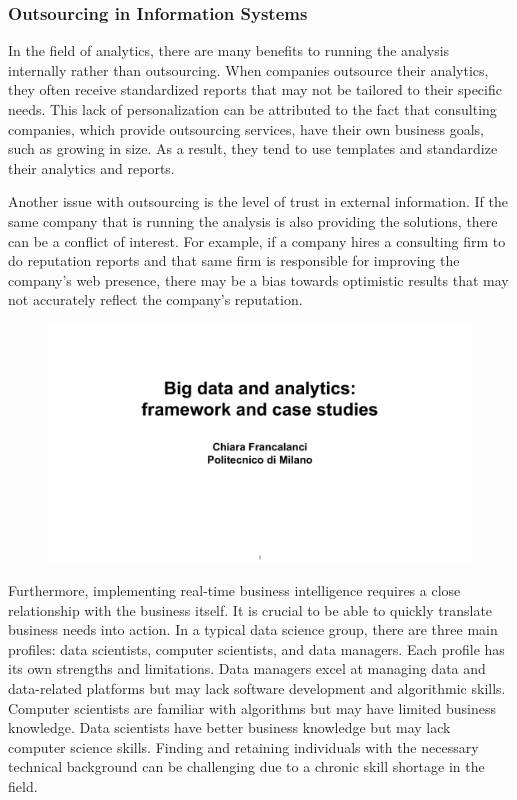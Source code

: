 \subsubsection{Outsourcing in Information Systems}

In the field of analytics, there are many benefits to running the
analysis internally rather than outsourcing. When companies outsource
their analytics, they often receive standardized reports that may not be
tailored to their specific needs. This lack of personalization can be
attributed to the fact that consulting companies, which provide
outsourcing services, have their own business goals, such as growing in
size. As a result, they tend to use templates and standardize their
analytics and reports.

Another issue with outsourcing is the level of trust in external
information. If the same company that is running the analysis is also
providing the solutions, there can be a conflict of interest. For
example, if a company hires a consulting firm to do reputation reports
and that same firm is responsible for improving the company's web
presence, there may be a bias towards optimistic results that may not
accurately reflect the company's reputation.

\begin{figure}[!h]
    \centering
    \includegraphics[page=78, trim = 1cm 1.8cm 3cm 5.8cm, clip, width=\textwidth]{images/06 - BIG_DATA.pdf}
\end{figure}

Furthermore, implementing real-time business intelligence requires a
close relationship with the business itself. It is crucial to be able to
quickly translate business needs into action. In a typical data science
group, there are three main profiles: data scientists, computer
scientists, and data managers. Each profile has its own strengths and
limitations. Data managers excel at managing data and data-related
platforms but may lack software development and algorithmic skills.
Computer scientists are familiar with algorithms but may have limited
business knowledge. Data scientists have better business knowledge but
may lack computer science skills. Finding and retaining individuals with
the necessary technical background can be challenging due to a chronic
skill shortage in the field.

